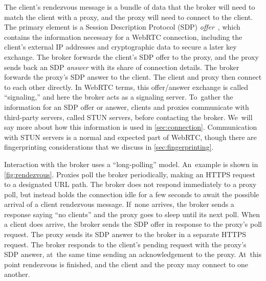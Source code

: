 \documentclass[letterpaper,twocolumn]{article}
\newcommand{\firstterm}[1]{\textit{#1}}
\begin{document}
The client's rendezvous message
is a bundle of data that the broker will need to match the client with a proxy,
and the proxy will need to connect to the client.
The primary element is a
Session Description Protocol (SDP) \firstterm{offer}~\cite{rfc8839},
which contains the information necessary for a WebRTC connection,
including the client's external IP addresses
and cryptographic data to secure a later key exchange.
The broker forwards the client's SDP offer to the proxy,
and the proxy sends back an SDP \firstterm{answer}
with its share of connection details.
The broker forwards the proxy's SDP answer to the client.
The client and proxy then connect to each other directly.
In WebRTC terms, this offer/\allowbreak answer exchange is called
``signaling,'' and here the broker acts as a signaling server.
To~gather the information for an SDP offer or answer,
clients and proxies communicate with third-party servers,
called STUN servers,
before contacting the broker.
We~will say more about how this information is used in \autoref{sec:connection}.
Communication with STUN servers is a normal and expected part of WebRTC,
though there are fingerprinting considerations
that we discuss in \autoref{sec:fingerprinting}.

Interaction with the broker uses a ``long-polling'' model.
An~example is shown in \autoref{fig:rendezvous}.
Proxies poll the broker periodically,
making an HTTPS request to a designated URL path.
The broker does not respond immediately to a proxy poll,
but instead holds the connection idle for a few seconds
to await the possible arrival of a client rendezvous message.
If~none arrives, the broker sends a response saying ``no clients''
and the proxy goes to sleep until its next poll.
When a client does arrive,
the broker sends the SDP offer in response
to the proxy's poll request.
The proxy sends its SDP answer to the broker
in a separate HTTPS request.
The broker responds to the client's pending request
with the proxy's SDP answer,
at~the same time sending an acknowledgement to the proxy.
At~this point rendezvous is finished,
and the client and the proxy may connect to one another.
\end{document}
